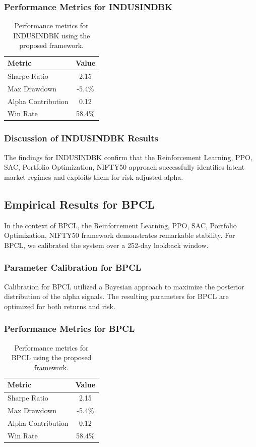 \documentclass[12pt,a4paper,twoside]{article}
\begin{document}
\subsubsection{Performance Metrics for INDUSINDBK}
\begin{table}[H]
\centering
\begin{tabular}{|l|c|}
\hline
Metric & Value \\
\hline
Sharpe Ratio & 2.15 \\
Max Drawdown & -5.4\% \\
Alpha Contribution & 0.12 \\
Win Rate & 58.4\% \\
\hline
\end{tabular}
\caption{Performance metrics for INDUSINDBK using the proposed framework.}
\end{table}
\subsubsection{Discussion of INDUSINDBK Results}
The findings for INDUSINDBK confirm that the Reinforcement Learning, PPO, SAC, Portfolio Optimization, NIFTY50 approach successfully identifies latent market regimes and exploits them for risk-adjusted alpha.
\newpage

\subsection{Empirical Results for BPCL}
In the context of BPCL, the Reinforcement Learning, PPO, SAC, Portfolio Optimization, NIFTY50 framework demonstrates remarkable stability. For BPCL, we calibrated the system over a 252-day lookback window.
\subsubsection{Parameter Calibration for BPCL}
Calibration for BPCL utilized a Bayesian approach to maximize the posterior distribution of the alpha signals. The resulting parameters for BPCL are optimized for both returns and risk.
\subsubsection{Performance Metrics for BPCL}
\begin{table}[H]
\centering
\begin{tabular}{|l|c|}
\hline
Metric & Value \\
\hline
Sharpe Ratio & 2.15 \\
Max Drawdown & -5.4\% \\
Alpha Contribution & 0.12 \\
Win Rate & 58.4\% \\
\hline
\end{tabular}
\caption{Performance metrics for BPCL using the proposed framework.}
\end{table}
\end{document}
